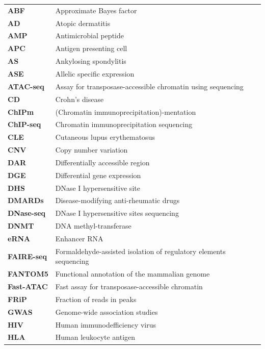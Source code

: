 \begin{longtable}{p{2.5cm}p{12.5cm}}
\textbf{ABF} & Approximate Bayes factor\\
\textbf{AD} & Atopic dermatitis \\
\textbf{AMP} & Antimicrobial peptide\\
\textbf{APC} &Antigen presenting cell \\
\textbf{AS} & Ankylosing spondylitis\\
\textbf{ASE} & Allelic specific expression \\
\textbf{ATAC-seq} & Assay for transposase-accessible chromatin using sequencing \\
\textbf{CD} & Crohn's disease\\
\textbf{ChIPm} & (Chromatin immunoprecipitation)-mentation  \\
\textbf{ChIP-seq} & Chromatin immunoprecipitation sequencing\\
\textbf{CLE} & Cutaneous lupus erythematosus \\
\textbf{CNV} & Copy number variation\\
\textbf{DAR} & Differentially accessible region  \\
\textbf{DGE} & Differential gene expression\\
\textbf{DHS} & DNase I hypersensitive site\\
\textbf{DMARDs} & Disease-modifying anti-rheumatic drugs \\
\textbf{DNase-seq} & DNase I hypersensitive sites sequencing\\
\textbf{DNMT} & DNA methyl-transferase\\
\textbf{eRNA} & Enhancer RNA\\
\textbf{FAIRE-seq} & Formaldehyde-assisted isolation of regulatory elements sequencing \\
\textbf{FANTOM5} & Functional annotation of the mammalian genome\\
\textbf{Fast-ATAC} & Fast  assay for transposase-accessible chromatin \\
\textbf{FRiP} & Fraction of reads in peaks \\
\textbf{GWAS} & Genome-wide association studies \\
\textbf{HIV} & Human immunodefficiency virus\\
\textbf{HLA} & Human leukocyte antigen\\

\end{longtable}
